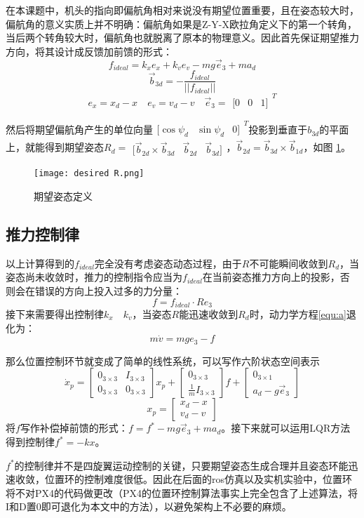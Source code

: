     在本课题中，机头的指向即偏航角相对来说没有期望位置重要，且在姿态较大时，偏航角的意义实质上并不明确：偏航角如果是Z-Y-X欧拉角定义下的第一个转角，当后两个转角较大时，偏航角也就脱离了原本的物理意义。因此首先保证期望推力方向，将其设计成反馈加前馈的形式：
    $$f_{ideal}=k_x e_x+k_v e_v-mg \vec e_3+m a_d$$
    $$\vec b_{3d}=-\frac{f_{ideal}}{||f_{ideal}||}$$
    $$ e_x=x_d-x \quad e_v=v_d-v \quad \vec e_3=\begin{matrix}
        [0 & 0 & 1]
    \end{matrix}^T$$

    然后将期望偏航角产生的单位向量$\begin{matrix} [\cos{\psi_d} & \sin{\psi_d} & 0]  \end{matrix}^T$投影到垂直于$b_{3d}$的平面上，就能得到期望姿态$R_d= \begin{matrix} [ \vec b_{2d}\times \vec b_{3d} &\vec b_{2d} & \vec b_{3d}] \end{matrix}$，$\vec b_{2d}=\vec b_{3d} \times \vec b_{1d}$，如图 \ref{fig:2}。
    \begin{figure}[!h]
        \centering
        \texttt{[image: desired R.png]}
        \caption{期望姿态定义}
        \label{fig:2}
      \end{figure}

      \subsection{推力控制律}
      以上计算得到的$f_{ideal}$完全没有考虑姿态动态过程，由于$R$不可能瞬间收敛到$R_d$，当姿态尚未收敛时，推力的控制指令应当为$f_{ideal}$在当前姿态推力方向上的投影，否则会在错误的方向上投入过多的力分量：
      $$f=f_{ideal}\cdot R e_3$$
      接下来需要得出控制律$k_x \quad k_v$，当姿态$R$能迅速收敛到$R_d$时，动力学方程\ref{equ:a}退化为：
      $$m \dot v=mge_3-f$$

      那么位置控制环节就变成了简单的线性系统，可以写作六阶状态空间表示
      $$\dot x_p=\begin{bmatrix}
        0_{3\times 3} & I_{3\times 3} \\
        0_{3\times 3} & 0_{3\times 3}
    \end{bmatrix} x_p+\begin{bmatrix}
        0_{3\times 3} \\ \frac{1}{m} I_{3\times 3}
    \end{bmatrix} f +\begin{bmatrix}
        0_{3 \times 1} \\ a_d-g \vec e_3 
    \end{bmatrix}$$
    $$x_p=\begin{bmatrix}
        x_d -x \\ v_d -v
    \end{bmatrix}$$
      将$f$写作补偿掉前馈的形式：$f=f^*-mg \vec e_3 +m a_d$。接下来就可以运用LQR方法得到控制律$f^*=-kx$。

    $f^*$的控制律并不是四旋翼运动控制的关键，只要期望姿态生成合理并且姿态环能迅速收敛，位置环的控制难度很低。因此在后面的ros仿真以及实机实验中，位置环将不对PX4的代码做更改（PX4的位置环控制算法事实上完全包含了上述算法，将I和D置0即可退化为本文中的方法），以避免架构上不必要的麻烦。
